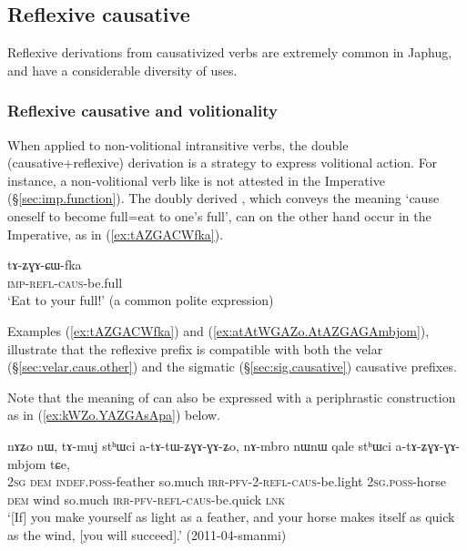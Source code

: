 \subsection{Reflexive causative} \label{sec:refl.caus}
Reflexive derivations from causativized verbs are extremely common in Japhug, and have a considerable diversity of uses.

\subsubsection{Reflexive causative and volitionality}  \label{sec:refl.caus.volitional}
When applied to non-volitional intransitive verbs, the double (causative+reflexive) derivation is a strategy to express volitional action. For instance, a non-volitional verb like  is not attested in the Imperative (§\ref{sec:imp.function}). The doubly derived , which conveys the meaning `cause oneself to become full=eat to one's full', can on the other hand occur in the Imperative, as in (\ref{ex:tAZGACWfka}).

\begin{exe}
\ex \label{ex:tAZGACWfka}
\gll tɤ-ʑɣɤ-ɕɯ-fka \\
\textsc{imp}-\textsc{refl}-\textsc{caus}-be.full \\
\glt `Eat to your full!' (a common polite expression)
 \end{exe}
 
Examples (\ref{ex:tAZGACWfka}) and (\ref{ex:atAtWGAZo.AtAZGAGAmbjom}), illustrate that the reflexive prefix is compatible with both the velar  (§\ref{sec:velar.caus.other}) and the sigmatic (§\ref{sec:sig.causative}) causative prefixes.  

 Note that the meaning of  can also be expressed with a periphrastic construction as in (\ref{ex:kWZo.YAZGAsApa}) below.
 
\begin{exe}
\ex \label{ex:atAtWGAZo.AtAZGAGAmbjom}
\gll nɤʑo nɯ, tɤ-muj stʰɯci a-tɤ-tɯ-ʑɣɤ-ɣɤ-ʑo,  nɤ-mbro nɯnɯ qale stʰɯci a-tɤ-ʑɣɤ-ɣɤ-mbjom tɕe, \\
\textsc{2sg} \textsc{dem} \textsc{indef}.\textsc{poss}-feather so.much \textsc{irr}-\textsc{pfv}-2-\textsc{refl}-\textsc{caus}-be.light \textsc{2sg}.\textsc{poss}-horse \textsc{dem} wind so.much \textsc{irr}-\textsc{pfv}-\textsc{refl}-\textsc{caus}-be.quick \textsc{lnk} \\
\glt  `[If] you make yourself as light as a feather, and your horse makes itself as quick as the wind, [you will succeed].'  (2011-04-smanmi)
 \end{exe}

